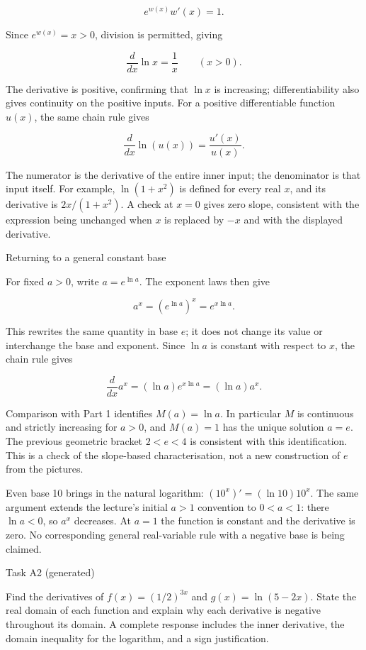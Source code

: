 \documentclass[
  11pt,
]{article}
\begin{document}
\[
e^{w(x)}w'(x)=1.
\]

Since \(e^{w(x)}=x>0\), division is permitted, giving

\[
\frac{d}{dx}\ln x=\frac1x\qquad(x>0).
\]

The derivative is positive, confirming that \(\ln x\) is increasing;
differentiability also gives continuity on the positive inputs. For a
positive differentiable function \(u(x)\), the same chain rule gives

\[
\frac{d}{dx}\ln(u(x))=\frac{u'(x)}{u(x)}.
\]

The numerator is the derivative of the entire inner input; the
denominator is that input itself. For example, \(\ln(1+x^2)\) is defined
for every real \(x\), and its derivative is \(2x/(1+x^2)\). A check at
\(x=0\) gives zero slope, consistent with the expression being unchanged
when \(x\) is replaced by \(-x\) and with the displayed derivative.

Returning to a general constant base

For fixed \(a>0\), write \(a=e^{\ln a}\). The exponent laws then give

\[
a^x=(e^{\ln a})^x=e^{x\ln a}.
\]

This rewrites the same quantity in base \(e\); it does not change its
value or interchange the base and exponent. Since \(\ln a\) is constant
with respect to \(x\), the chain rule gives

\[
\frac{d}{dx}a^x=(\ln a)e^{x\ln a}=(\ln a)a^x.
\]

Comparison with Part 1 identifies \(M(a)=\ln a\). In particular \(M\) is
continuous and strictly increasing for \(a>0\), and \(M(a)=1\) has the
unique solution \(a=e\). The previous geometric bracket \(2<e<4\) is
consistent with this identification. This is a check of the slope-based
characterisation, not a new construction of \(e\) from the pictures.

Even base 10 brings in the natural logarithm: \((10^x)'=(\ln10)10^x\).
The same argument extends the lecture's initial \(a>1\) convention to
\(0<a<1\): there \(\ln a<0\), so \(a^x\) decreases. At \(a=1\) the
function is constant and the derivative is zero. No corresponding
general real-variable rule with a negative base is being claimed.

Task A2 (generated)

Find the derivatives of \(f(x)=(1/2)^{3x}\) and \(g(x)=\ln(5-2x)\).
State the real domain of each function and explain why each derivative
is negative throughout its domain. A complete response includes the
inner derivative, the domain inequality for the logarithm, and a sign
justification.
\end{document}

